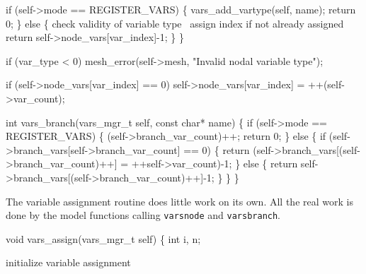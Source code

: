     if (self->mode == REGISTER_VARS) \{
        vars_add_vartype(self, name);
        return 0;
    \} else \{
        \LA{}check validity of variable type~{\nwtagstyle{}}\RA{}
        \LA{}assign index if not already assigned~{\nwtagstyle{}}\RA{}
        return self->node_vars[var_index]-1;
    \}
\}

\nwendcode{}\nwdocspar

\nwenddocs{}\endmoddef
if (var_type < 0)
    mesh_error(self->mesh, "Invalid nodal variable type");
\nwendcode{}\nwdocspar

\nwenddocs{}\endmoddef
if (self->node_vars[var_index] == 0) 
    self->node_vars[var_index] = ++(self->var_count);
\nwendcode{}\nwdocspar

\nwenddocs{}\plusendmoddef
int vars_branch(vars_mgr_t self, const char* name)
\{
    if (self->mode == REGISTER_VARS) \{
        (self->branch_var_count)++;
        return 0;
    \} else \{
        if (self->branch_vars[self->branch_var_count] == 0) \{
            return (self->branch_vars[(self->branch_var_count)++] = 
                    ++self->var_count)-1;
        \} else \{
            return self->branch_vars[(self->branch_var_count)++]-1;
        \}
    \}
\}

\nwendcode{}\nwdocspar

The variable assignment routine does little work on its own.
All the real work is done by the model functions calling
{\tt{}vars{}node} and {\tt{}vars{}branch}.

\nwenddocs{}\plusendmoddef
void vars_assign(vars_mgr_t self)
\{
    int i, n;

    \LA{}initialize variable assignment~{\nwtagstyle{}}\RA{}

